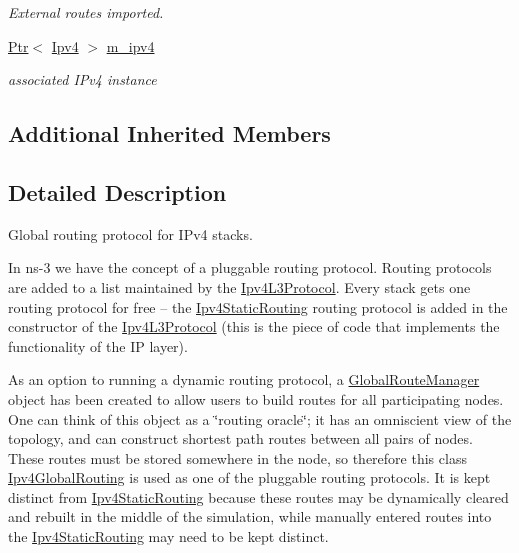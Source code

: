 \begin{DoxyCompactItemize}
\begin{DoxyCompactList}\small\item\em External routes imported. \end{DoxyCompactList}\item 
\hyperlink{classns3_1_1Ptr}{Ptr}$<$ \hyperlink{classns3_1_1Ipv4}{Ipv4} $>$ \hyperlink{classns3_1_1Ipv4GlobalRouting_a8ca97d33982a32fa41a98b56dbec2edc}{m\+\_\+ipv4}
\begin{DoxyCompactList}\small\item\em associated I\+Pv4 instance \end{DoxyCompactList}\end{DoxyCompactItemize}
\subsection*{Additional Inherited Members}


\subsection{Detailed Description}
Global routing protocol for I\+Pv4 stacks. 

In ns-\/3 we have the concept of a pluggable routing protocol. Routing protocols are added to a list maintained by the \hyperlink{classns3_1_1Ipv4L3Protocol}{Ipv4\+L3\+Protocol}. Every stack gets one routing protocol for free -- the \hyperlink{classns3_1_1Ipv4StaticRouting}{Ipv4\+Static\+Routing} routing protocol is added in the constructor of the \hyperlink{classns3_1_1Ipv4L3Protocol}{Ipv4\+L3\+Protocol} (this is the piece of code that implements the functionality of the IP layer).

As an option to running a dynamic routing protocol, a \hyperlink{classns3_1_1GlobalRouteManager}{Global\+Route\+Manager} object has been created to allow users to build routes for all participating nodes. One can think of this object as a \char`\"{}routing oracle\char`\"{}; it has an omniscient view of the topology, and can construct shortest path routes between all pairs of nodes. These routes must be stored somewhere in the node, so therefore this class \hyperlink{classns3_1_1Ipv4GlobalRouting}{Ipv4\+Global\+Routing} is used as one of the pluggable routing protocols. It is kept distinct from \hyperlink{classns3_1_1Ipv4StaticRouting}{Ipv4\+Static\+Routing} because these routes may be dynamically cleared and rebuilt in the middle of the simulation, while manually entered routes into the \hyperlink{classns3_1_1Ipv4StaticRouting}{Ipv4\+Static\+Routing} may need to be kept distinct.

